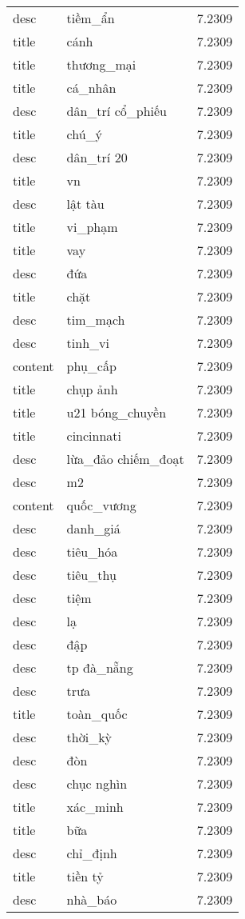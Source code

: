 \documentclass{article}
\begin{document}
\begin{tabular}{lll}
desc & tiềm\_ẩn & 7.2309\\
title & cánh & 7.2309\\
title & thương\_mại & 7.2309\\
title & cá\_nhân & 7.2309\\
desc & dân\_trí cổ\_phiếu & 7.2309\\
title & chú\_ý & 7.2309\\
desc & dân\_trí 20 & 7.2309\\
title & vn & 7.2309\\
desc & lật tàu & 7.2309\\
title & vi\_phạm & 7.2309\\
title & vay & 7.2309\\
desc & đứa & 7.2309\\
title & chặt & 7.2309\\
desc & tim\_mạch & 7.2309\\
desc & tinh\_vi & 7.2309\\
content & phụ\_cấp & 7.2309\\
title & chụp ảnh & 7.2309\\
title & u21 bóng\_chuyền & 7.2309\\
title & cincinnati & 7.2309\\
desc & lừa\_đảo chiếm\_đoạt & 7.2309\\
desc & m2 & 7.2309\\
content & quốc\_vương & 7.2309\\
desc & danh\_giá & 7.2309\\
desc & tiêu\_hóa & 7.2309\\
desc & tiêu\_thụ & 7.2309\\
desc & tiệm & 7.2309\\
desc & lạ & 7.2309\\
desc & đập & 7.2309\\
desc & tp đà\_nẵng & 7.2309\\
desc & trưa & 7.2309\\
title & toàn\_quốc & 7.2309\\
desc & thời\_kỳ & 7.2309\\
desc & đòn & 7.2309\\
desc & chục nghìn & 7.2309\\
title & xác\_minh & 7.2309\\
title & bữa & 7.2309\\
desc & chỉ\_định & 7.2309\\
title & tiền tỷ & 7.2309\\
desc & nhà\_báo & 7.2309\\

\end{tabular}
\end{document}
